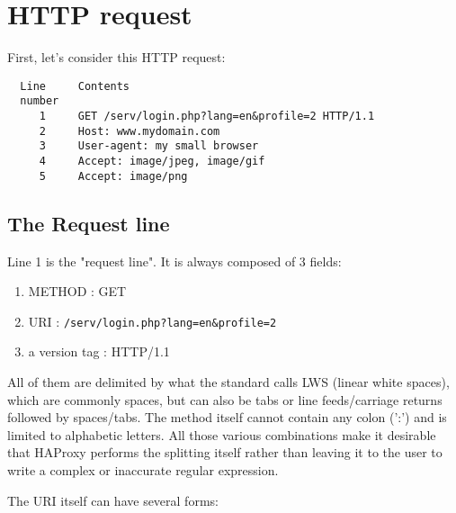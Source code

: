 \section{HTTP request}
First, let's consider this HTTP request:

\begin{verbatim}
  Line     Contents
  number
     1     GET /serv/login.php?lang=en&profile=2 HTTP/1.1
     2     Host: www.mydomain.com
     3     User-agent: my small browser
     4     Accept: image/jpeg, image/gif
     5     Accept: image/png
\end{verbatim}

\subsection{The Request line}
Line 1 is the "request line". It is always composed of 3 fields:

\begin{enumerate}
\item METHOD : GET
\item URI : \verb|/serv/login.php?lang=en&profile=2|
\item a version tag : HTTP/1.1
\end{enumerate}

All of them are delimited by what the standard calls LWS (linear white spaces),
which are commonly spaces, but can also be tabs or line feeds/carriage returns
followed by spaces/tabs. The method itself cannot contain any colon (':') and
is limited to alphabetic letters. All those various combinations make it
desirable that HAProxy performs the splitting itself rather than leaving it to
the user to write a complex or inaccurate regular expression.

The URI itself can have several forms:

